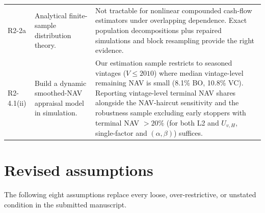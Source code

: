 \documentclass[11pt]{article}
\begin{document}
{\begin{longtable}{@{}L{2.3cm}L{5.5cm}L{7.5cm}@{}}
R2-2a & Analytical finite-sample distribution theory. & Not tractable for nonlinear compounded cash-flow estimators under overlapping dependence. Exact population decompositions plus repaired simulations and block resampling provide the right evidence.\\
R2-4.1(ii) & Build a dynamic smoothed-NAV appraisal model in simulation. & Our estimation sample restricts to seasoned vintages ($V\le 2010$) where median vintage-level remaining NAV is small (8.1\% BO, 10.8\% VC). Reporting vintage-level terminal NAV shares alongside the NAV-haircut sensitivity and the robustness sample excluding early stoppers with terminal NAV $>20\%$ (for both L2 and $U_{v,H}$, single-factor and $(\alpha,\beta)$) suffices.\\
\bottomrule
\end{longtable}
}

\section{Revised assumptions}
\label{sec:assumptions}

The following eight assumptions replace every loose, over-restrictive, or unstated condition in the submitted manuscript.
\end{document}
